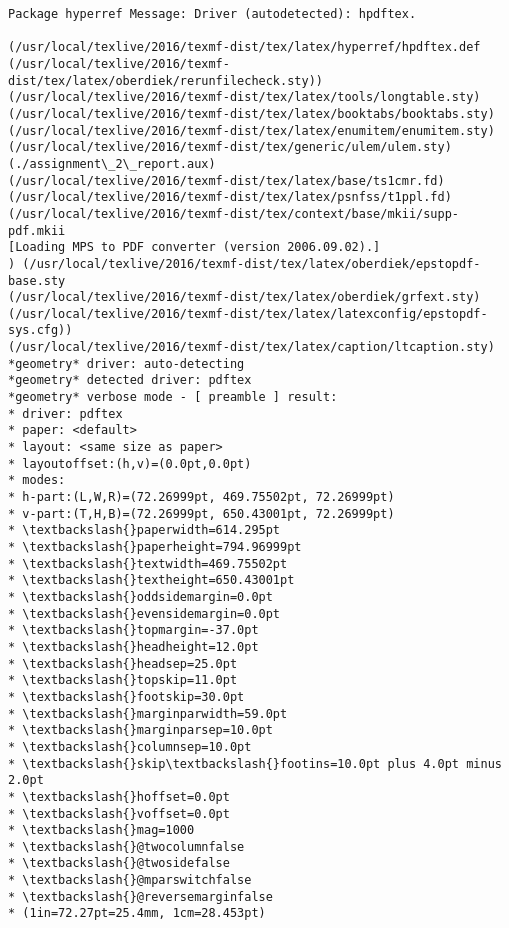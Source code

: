 \documentclass[11pt]{article}
\begin{document}
\begin{Verbatim}[commandchars=\\\{\}]
Package hyperref Message: Driver (autodetected): hpdftex.

(/usr/local/texlive/2016/texmf-dist/tex/latex/hyperref/hpdftex.def
(/usr/local/texlive/2016/texmf-dist/tex/latex/oberdiek/rerunfilecheck.sty))
(/usr/local/texlive/2016/texmf-dist/tex/latex/tools/longtable.sty)
(/usr/local/texlive/2016/texmf-dist/tex/latex/booktabs/booktabs.sty)
(/usr/local/texlive/2016/texmf-dist/tex/latex/enumitem/enumitem.sty)
(/usr/local/texlive/2016/texmf-dist/tex/generic/ulem/ulem.sty)
(./assignment\_2\_report.aux)
(/usr/local/texlive/2016/texmf-dist/tex/latex/base/ts1cmr.fd)
(/usr/local/texlive/2016/texmf-dist/tex/latex/psnfss/t1ppl.fd)
(/usr/local/texlive/2016/texmf-dist/tex/context/base/mkii/supp-pdf.mkii
[Loading MPS to PDF converter (version 2006.09.02).]
) (/usr/local/texlive/2016/texmf-dist/tex/latex/oberdiek/epstopdf-base.sty
(/usr/local/texlive/2016/texmf-dist/tex/latex/oberdiek/grfext.sty)
(/usr/local/texlive/2016/texmf-dist/tex/latex/latexconfig/epstopdf-sys.cfg))
(/usr/local/texlive/2016/texmf-dist/tex/latex/caption/ltcaption.sty)
*geometry* driver: auto-detecting
*geometry* detected driver: pdftex
*geometry* verbose mode - [ preamble ] result:
* driver: pdftex
* paper: <default>
* layout: <same size as paper>
* layoutoffset:(h,v)=(0.0pt,0.0pt)
* modes: 
* h-part:(L,W,R)=(72.26999pt, 469.75502pt, 72.26999pt)
* v-part:(T,H,B)=(72.26999pt, 650.43001pt, 72.26999pt)
* \textbackslash{}paperwidth=614.295pt
* \textbackslash{}paperheight=794.96999pt
* \textbackslash{}textwidth=469.75502pt
* \textbackslash{}textheight=650.43001pt
* \textbackslash{}oddsidemargin=0.0pt
* \textbackslash{}evensidemargin=0.0pt
* \textbackslash{}topmargin=-37.0pt
* \textbackslash{}headheight=12.0pt
* \textbackslash{}headsep=25.0pt
* \textbackslash{}topskip=11.0pt
* \textbackslash{}footskip=30.0pt
* \textbackslash{}marginparwidth=59.0pt
* \textbackslash{}marginparsep=10.0pt
* \textbackslash{}columnsep=10.0pt
* \textbackslash{}skip\textbackslash{}footins=10.0pt plus 4.0pt minus 2.0pt
* \textbackslash{}hoffset=0.0pt
* \textbackslash{}voffset=0.0pt
* \textbackslash{}mag=1000
* \textbackslash{}@twocolumnfalse
* \textbackslash{}@twosidefalse
* \textbackslash{}@mparswitchfalse
* \textbackslash{}@reversemarginfalse
* (1in=72.27pt=25.4mm, 1cm=28.453pt)


\end{Verbatim}
\end{document}
